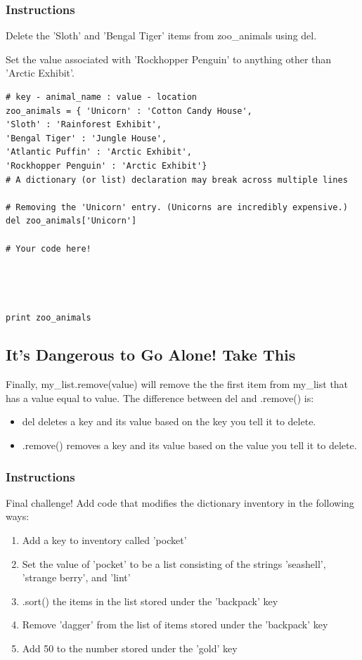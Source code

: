 \documentclass[12pt,a4paper,final,twoside,onecolumn,titlepage]{book}
\begin{document}
\subsubsection{Instructions}

Delete the 'Sloth' and 'Bengal Tiger' items from zoo\_animals using del.

Set the value associated with 'Rockhopper Penguin' to anything other than 'Arctic Exhibit'.
\begin{lstlisting}
# key - animal_name : value - location 
zoo_animals = { 'Unicorn' : 'Cotton Candy House',
'Sloth' : 'Rainforest Exhibit',
'Bengal Tiger' : 'Jungle House',
'Atlantic Puffin' : 'Arctic Exhibit',
'Rockhopper Penguin' : 'Arctic Exhibit'}
# A dictionary (or list) declaration may break across multiple lines

# Removing the 'Unicorn' entry. (Unicorns are incredibly expensive.)
del zoo_animals['Unicorn']

# Your code here!




print zoo_animals
\end{lstlisting}

\subsection{It's Dangerous to Go Alone! Take This}

Finally, my\_list.remove(value) will remove the the first item from my\_list that has a value equal to value. The difference between del and .remove() is:
\begin{itemize}
\item    del deletes a key and its value based on the key you tell it to delete.
\item    .remove() removes a key and its value based on the value you tell it to delete.
\end{itemize}

\subsubsection{Instructions}

Final challenge! Add code that modifies the dictionary inventory in the following ways:
\begin{enumerate}
\item    Add a key to inventory called 'pocket'
\item    Set the value of 'pocket' to be a list consisting of the strings 'seashell', 'strange berry', and 'lint'
\item    .sort() the items in the list stored under the 'backpack' key
\item    Remove 'dagger' from the list of items stored under the 'backpack' key
\item    Add 50 to the number stored under the 'gold' key
\end{enumerate}
\end{document}
